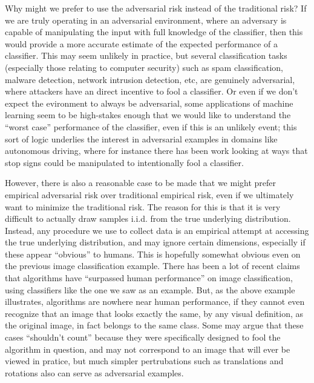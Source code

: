 \documentclass[LaM,binding=0.6cm]{./packages/sapthesis/sapthesis}
\begin{document}
        Why might we prefer to use the adversarial risk instead of the traditional risk? If we are truly operating in an adversarial environment, where an adversary is capable of 
        manipulating the input with full knowledge of the classifier, then this would provide a more accurate estimate of the expected performance of a classifier. 
        This may seem unlikely in practice, but several classification tasks (especially those relating to computer security) such as spam classification, malware detection, 
        network intrusion detection, etc, are genuinely adversarial, where attackers have an direct incentive to fool a classifier. 
        Or even if we don’t expect the evironment to always be adversarial, some applications of machine learning seem to be high-stakes enough that we would like 
        to understand the “worst case” performance of the classifier, even if this is an unlikely event; this sort of logic underlies the interest in adversarial examples in domains 
        like autonomous driving, where for instance there has been work looking at ways that stop signs could be manipulated to intentionally fool a classifier.

        However, there is also a reasonable case to be made that we might prefer empirical adversarial risk over traditional empirical risk, even if we ultimately want to minimize the 
        traditional risk. The reason for this is that it is very difficult to actually draw samples i.i.d. from the true underlying distribution. 
        Instead, any procedure we use to collect data is an empirical attempt at accessing the true underlying distribution, and may ignore certain dimensions, especially if these appear “obvious” 
        to humans. This is hopefully somewhat obvious even on the previous image classification example. 
        There has been a lot of recent claims that algorithms have “surpassed human performance” on image classification, using classifiers like the one we saw as an example. 
        But, as the above example illustrates, algorithms are nowhere near human performance, if they cannot even recognize that an image that looks exactly the same, 
        by any visual definition, as the original image, in fact belongs to the same class. Some may argue that these cases “shouldn’t count” because they were specifically designed to fool 
        the algorithm in question, and may not correspond to an image that will ever be viewed in pratice, but much simpler pertrubations such as translations and rotations also can serve as 
        adversarial examples.
\end{document}

